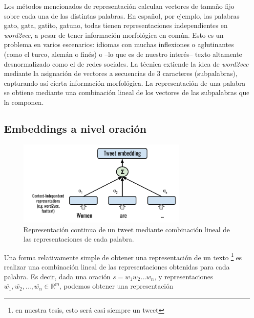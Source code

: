 Los métodos mencionados de representación calculan vectores de tamaño fijo sobre cada una de las distintas palabras. En español, por ejemplo, las palabras gato, gata, gatito, gatuno, todas tienen representaciones independientes en \emph{word2vec}, a pesar de tener información morfológica en común. Esto es un problema en varios escenarios: idiomas con muchas inflexiones o aglutinantes (como el turco, alemán o finés) o --lo que es de nuestro interés-- texto altamente desnormalizado como el de redes sociales. La técnica \fasttext{} \cite{bojanowski16} extiende la idea de \emph{word2vec} mediante la asignación de vectores a secuencias de 3 caracteres (subpalabras), capturando así cierta información morfológica. La representación de una palabra se obtiene mediante una combinación lineal de los vectores de las subpalabras que la componen.

\subsection{Embeddings a nivel oración}
\label{sec:02_tweet_embeddings}


\begin{figure}[t]
    \centering
    \includegraphics[width=0.75\textwidth]{img/tweet_embeddings.pdf}
    \caption{Representación continua de un tweet mediante combinación lineal de las representaciones de cada palabra.}
    \label{fig:tweet_embeddings}
\end{figure}

Una forma relativamente simple de obtener una representación de un texto \footnote{en nuestra tesis, esto será casi siempre un tweet} es realizar una combinación lineal de las representaciones obtenidas para cada palabra. Es decir, dada una oración $s = w_1 w_2 \ldots w_n$, y representaciones $\overline{w_1}, \overline{w_2}, \ldots, \overline{w_n} \in \mathbb{R}^m$, podemos obtener una representación

